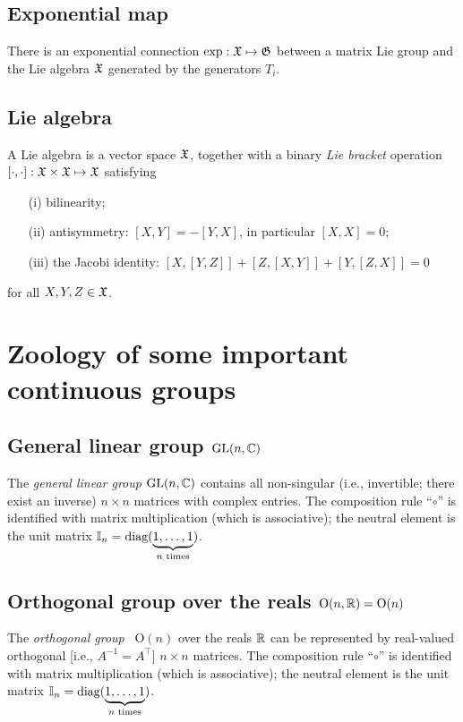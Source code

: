 \subsection{Exponential map}
There is an exponential connection
$\exp : {\frak X} \mapsto {\frak G}$
between a matrix Lie group
and the Lie algebra ${\frak X}$ generated by the generators
$ T_i $.

\subsection{Lie algebra}

A Lie algebra is a vector space ${\frak X}$,
together with a binary
{\em Lie bracket}
operation $[\cdot,\cdot ]: {\frak X} \times {\frak X}  \mapsto {\frak X} $
satisfying
\begin{itemize}
\item[(i)]
bilinearity;
\item[(ii)]
antisymmetry: $[X,Y]=-[Y,X]$, in particular $[X,X]=0$;
\item[(iii)]
the Jacobi identity:
$[X,[Y,Z]] +  [Z,[X,Y]] + [Y,[Z,X]] =0$
\end{itemize}
for all $X,Y,Z \in {\frak X}$.


\section{Zoology of some important continuous groups}

\subsection{General linear group $\textrm{GL}(n,{\Bbb C})$}

The {\em general linear group} $\textrm{GL}(n,{\Bbb C})$
contains all  non-singular (i.e., invertible; there exist an inverse)
$n\times n$ matrices with complex entries.
The composition rule ``$\circ$''
is identified with matrix multiplication (which is associative); the neutral element is the unit
matrix ${\Bbb I}_n=\textrm{diag}(\underbrace{1,\ldots ,1}_{n \textrm{ times}})$.

\subsection{Orthogonal group over the reals $\textrm{O}(n,{\Bbb R})=\textrm{O}(n)$}

The {\em orthogonal group}~\cite{murnaghan} $\textrm{O}(n)$ over the reals ${\Bbb R}$
can be represented by real-valued  orthogonal [i.e., $  A  ^{-1}=    A   ^\intercal $]
$n\times n$ matrices.
The composition rule ``$\circ$''
is identified with matrix multiplication (which is associative); the neutral element is the unit
matrix ${\Bbb I}_n=\textrm{diag}(\underbrace{1,\ldots ,1}_{n \textrm{ times}})$.

